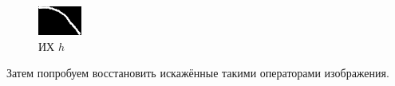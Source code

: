 \begin{figure}[h]
	\centering
	\includegraphics[width=0.3\linewidth]{../input/drawn-psf3}
	\caption{ИХ $h$}
	\label{fig:drawnPsf3}
\end{figure}
Затем попробуем восстановить искажённые такими операторами изображения.

